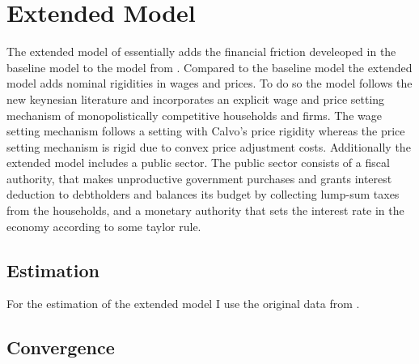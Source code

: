\section{Extended Model}
\label{sec:extended_model}

The extended model of \textcite{jerman_macroeconomic_2012} essentially
adds the financial friction develeoped in the baseline model to the
model from \textcite{smets_shocks_2007}. Compared to the baseline model the
extended model adds nominal rigidities in wages and prices. To do so the model
follows the new keynesian literature and incorporates an explicit wage and
price setting mechanism of monopolistically competitive households and
firms. The wage setting mechanism follows a setting with Calvo's price
rigidity \parencite{calvo_staggered_1983} whereas the price setting mechanism
is rigid due to convex price adjustment costs. Additionally the extended model
includes a public sector. The public sector consists of a fiscal authority, that
makes unproductive government purchases and grants interest deduction to
debtholders and balances its budget by collecting lump-sum taxes from the
households, and a monetary authority that sets the interest rate in the economy
according to some taylor rule.

\subsection{Estimation}
\label{sec:estimation}

For the estimation of the extended model I use the original data from
\textcite{jerman_macroeconomic_2012}. 

\begin{table}
  \centering
  \caption{Parameterization}
  \label{tab:estimation}
\end{table}

\subsection{Convergence}
\label{sec:convergence}





